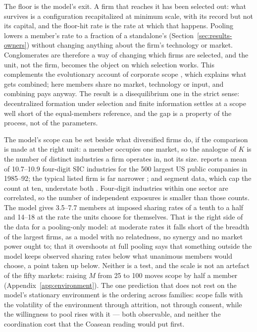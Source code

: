 The floor is the model's exit. A firm that reaches it has been selected out: what survives is a configuration recapitalized at minimum scale, with its record but not its capital, and the floor-hit rate is the rate at which that happens. Pooling lowers a member's rate to a fraction of a standalone's (Section~\ref{sec:results-owners}) without changing anything about the firm's technology or market. Conglomerates are therefore a way of changing which firms are selected, and the unit, not the firm, becomes the object on which selection works. This complements the evolutionary account of corporate scope \parencite{teece1994understanding}, which explains what gets combined; here members share no market, technology or input, and combining pays anyway. The result is a disequilibrium one in the strict sense: decentralized formation under selection and finite information settles at a scope well short of the equal-members reference, and the gap is a property of the process, not of the parameters.

The model's scope can be set beside what diversified firms do, if the comparison is made at the right unit: a member occupies one market, so the analogue of $K$ is the number of distinct industries a firm operates in, not its size. \textcite{montgomery1994corporate} reports a mean of 10.7--10.9 four-digit SIC industries for the 500 largest US public companies in 1985--92; the typical listed firm is far narrower \parencite{lichtenberg1992industrial}; and segment data, which cap the count at ten, understate both \parencite{villalonga2004diversification}. Four-digit industries within one sector are correlated, so the number of independent exposures is smaller than those counts. The model gives 3.5--7.7 members at imposed sharing rates of a tenth to a half and 14--18 at the rate the units choose for themselves. That is the right side of the data for a pooling-only model: at moderate rates it falls short of the breadth of the largest firms, as a model with no relatedness, no synergy and no market power ought to; that it overshoots at full pooling says that something outside the model keeps observed sharing rates below what unanimous members would choose, a point taken up below. Neither is a test, and the scale is not an artefact of the fifty markets: raising $M$ from 25 to 100 moves scope by half a member (Appendix~\ref{app:environment}). The one prediction that does not rest on the model's stationary environment is the ordering across families: scope falls with the volatility of the environment through attrition, not through consent, while the willingness to pool rises with it --- both observable, and neither the coordination cost that the Coasean reading would put first.

